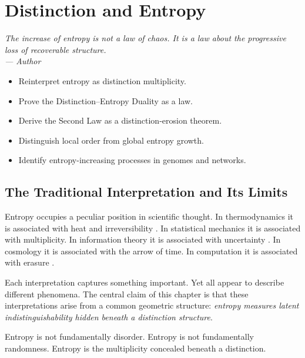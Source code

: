 \documentclass[12pt,twoside,openright]{book}
\newenvironment{epigraph}[2]{%
  \vspace{1em}\begin{flushright}
  \begin{minipage}{0.72\textwidth}
  \itshape\small #1\\[0.4em]
  \upshape\footnotesize\sffamily\color{DistGray}--- #2
  \end{minipage}\end{flushright}\vspace{1.5em}}{}
\newenvironment{objectives}{%
  \begin{tcolorbox}[colback=DistBlue!5,colframe=DistBlue,
    title={\faCheckCircle\enspace Learning Objectives},
    fonttitle=\sffamily\bfseries\color{white},
    attach boxed title to top left={yshift=-2mm,xshift=4mm},
    boxed title style={colback=DistBlue},breakable]
  \begin{itemize}[leftmargin=*,nosep]}{%
  \end{itemize}\end{tcolorbox}\vspace{1em}}
\begin{document}

\chapter{Distinction and Entropy}
\label{ch:entropy}

\begin{epigraph}{The increase of entropy is not a law of
  chaos. It is a law about the progressive loss of
  recoverable structure.}{Author}
\end{epigraph}

\begin{objectives}
  \item Reinterpret entropy as distinction multiplicity.
  \item Prove the Distinction--Entropy Duality as a law.
  \item Derive the Second Law as a distinction-erosion
        theorem.
  \item Distinguish local order from global entropy growth.
  \item Identify entropy-increasing processes in genomes
        and networks.
\end{objectives}

\section{The Traditional Interpretation and Its Limits}
\label{sec:ch3-trad}

Entropy occupies a peculiar position in scientific
thought. In thermodynamics it is associated with heat
and irreversibility \parencite{boltzmann1877,gibbs1902}.
In statistical mechanics it is associated with
multiplicity. In information theory it is associated with
uncertainty \parencite{jaynes1957}. In cosmology it is
associated with the arrow of time. In computation it is
associated with erasure \parencite{landauer1961irreversibility}.

Each interpretation captures something important. Yet all
appear to describe different phenomena. The central claim
of this chapter is that these interpretations arise from
a common geometric structure: \emph{entropy measures
latent indistinguishability hidden beneath a distinction
structure}.

Entropy is not fundamentally disorder. Entropy is not
fundamentally randomness. Entropy is the multiplicity
concealed beneath a distinction.
\end{document}
